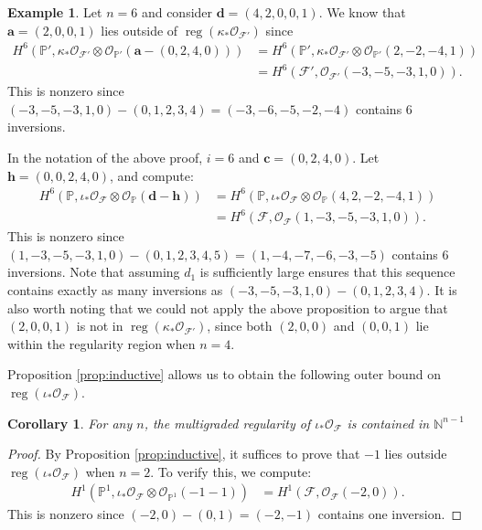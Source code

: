 \documentclass[12pt,reqno]{amsart}
\newtheorem{corollary}[theorem]{Corollary}
\theoremstyle{definition}
\newtheorem{example}[theorem]{Example}
\theoremstyle{remark}
\newcommand{\reg}{\operatorname{reg}}
\newcommand{\calF}{{\mathcal{F}}}
\newcommand{\calO}{{\mathcal{O}}}
\begin{document}
\begin{example}
    Let $n = 6$ and consider $\mathbf d = (4,2,0,0,1)$.  We know that $\mathbf a = (2,0,0,1)$ lies outside of $\reg(\kappa_*\calO_{\calF'})$ since
    \begin{align*}
    H^6(\mathbb P', \kappa_*\calO_{\calF'}\otimes\calO_{\mathbb P'}(\mathbf a - (0,2,4,0))) & = H^6(\mathbb P', \kappa_*\calO_{\calF'}\otimes\calO_{\mathbb P'}(2,-2,-4,1))\\
    &= H^6(\calF',\calO_{\calF'}(-3,-5,-3,1,0)).
    \end{align*}
    This is nonzero since $(-3,-5,-3,1,0) - (0,1,2,3,4) = (-3,-6,-5,-2,-4)$ contains $6$ inversions.
    
    In the notation of the above proof, $i = 6$ and $\mathbf c = (0,2,4,0)$.  Let $\mathbf h = (0,0,2,4,0)$, and compute:
    \begin{align*}
        H^6(\mathbb P, \iota_*\calO_{\calF}\otimes\calO_{\mathbb P}(\mathbf d - \mathbf h)) & = H^6(\mathbb P, \iota_*\calO_{\calF}\otimes\calO_{\mathbb P}(4,2,-2,-4,1))\\
        &= H^6(\calF,\calO_{\calF}(1,-3,-5,-3,1,0)).
    \end{align*}
    This is nonzero since $(1,-3,-5,-3,1,0) - (0,1,2,3,4,5) = (1,-4,-7,-6,-3,-5)$ contains $6$ inversions.  Note that assuming $d_1$ is sufficiently large ensures that this sequence contains exactly as many inversions as $(-3,-5,-3,1,0) - (0,1,2,3,4)$.
    It is also worth noting that we could not apply the above proposition to argue that $(2,0,0,1)$ is not in $\reg(\kappa_*\calO_{\calF'})$, since both $(2,0,0)$ and $(0,0,1)$ lie within the regularity region when $n=4$.
\end{example}

Proposition \ref{prop:inductive} allows us to obtain the following outer bound on $\reg(\iota_*\calO_{\calF})$.

\begin{corollary}
\label{cor:positiveOrthant}
    For any $n$, the multigraded regularity of $\iota_*\calO_{\calF}$ is contained in $\mathbb N^{n-1}$
\end{corollary}

\begin{proof}
    By Proposition \ref{prop:inductive}, it suffices to prove that $-1$ lies outside $\reg(\iota_*\calO_{\calF})$ when $n=2$.  To verify this, we compute:
    \begin{align*}
        H^1(\mathbb P^1, \iota_*\calO_{\calF}\otimes\calO_{\mathbb P^1}(-1-1)) &= H^1(\calF, \calO_{\calF}(-2,0)).
    \end{align*}
    This is nonzero since $(-2,0)-(0,1) = (-2,-1)$ contains one inversion.
\end{proof}
\end{document}
